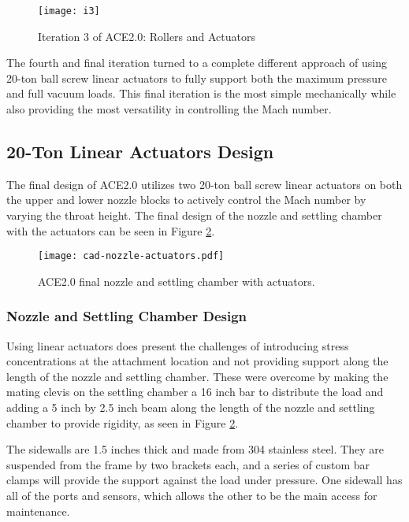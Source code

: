 \begin{figure}[ht!]
    \centering
    \texttt{[image: i3]}
    \caption{Iteration 3 of ACE2.0: Rollers and Actuators}
    \label{fig:i3}
\end{figure}

The fourth and final iteration turned to a complete different approach of using 20-ton ball screw linear actuators to fully support both the maximum pressure and full vacuum loads. This final iteration is the most simple mechanically while also providing the most versatility in controlling the Mach number.

\subsection{20-Ton Linear Actuators Design}

The final design of ACE2.0 utilizes two 20-ton ball screw linear actuators on both the upper and lower nozzle blocks to actively control the Mach number by varying the throat height. The final design of the nozzle and settling chamber with the actuators can be seen in Figure \ref{fig:cad-nozzle-actuators}. 

\begin{figure}[ht!]
    \centering
    \texttt{[image: cad-nozzle-actuators.pdf]}
    \caption{ACE2.0 final nozzle and settling chamber with actuators.}
    \label{fig:cad-nozzle-actuators}
\end{figure}

\subsubsection*{Nozzle and Settling Chamber Design}

Using linear actuators does present the challenges of introducing stress concentrations at the attachment location and not providing support along the length of the nozzle and settling chamber. These were overcome by making the mating clevis on the settling chamber a 16 inch bar to distribute the load and adding a 5 inch by 2.5 inch beam along the length of the nozzle and settling chamber to provide rigidity, as seen in Figure \ref{fig:cad-nozzle-actuators}.

The sidewalls are 1.5 inches thick and made from 304 stainless steel. They are suspended from the frame by two brackets each, and a series of custom bar clamps will provide the support against the load under pressure. One sidewall has all of the ports and sensors, which allows the other to be the main access for maintenance.

